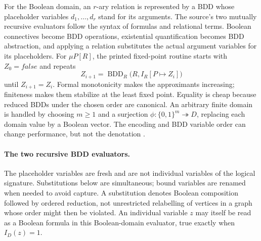 For the Boolean domain, an \(r\)-ary relation is represented by a BDD whose
placeholder variables \(d_1,\ldots,d_r\) stand for its arguments.  The source's
two mutually recursive evaluators follow the syntax of formulas and relational
terms.  Boolean connectives become BDD operations, existential quantification
becomes BDD abstraction, and applying a relation substitutes the actual
argument variables for its placeholders.  For \(\mu P[R]\), the printed
fixed-point routine starts with \(Z_0=\mathit{false}\) and repeats
\[
 Z_{i+1}
   =\operatorname{BDD}_{R}
      \bigl(R,I_R[P\mapsto Z_i]\bigr)
\]
until \(Z_{i+1}=Z_i\).  Formal monotonicity makes the approximants increasing;
finiteness makes them stabilize at the least fixed point.  Equality is cheap
because reduced BDDs under the chosen order are canonical.  An arbitrary
finite domain is handled by choosing \(m\geq1\) and a surjection
\(\phi:\{0,1\}^{m}\twoheadrightarrow D\), replacing each domain value by a
Boolean vector.  The encoding and BDD variable order can change performance,
but not the denotation
\cite[\S4 and fig.~2]{BurchEtAl1992}.

\paragraph{The two recursive BDD evaluators.}
The placeholder variables are fresh and are not individual variables of the
logical signature. Substitutions below are simultaneous; bound variables are
renamed when needed to avoid capture. A substitution denotes Boolean
composition followed by ordered reduction, not unrestricted relabelling of
vertices in a graph whose order might then be violated.
An individual variable \(z\) may itself
be read as a Boolean formula in this Boolean-domain evaluator, true exactly
when \(I_D(z)=1\).

